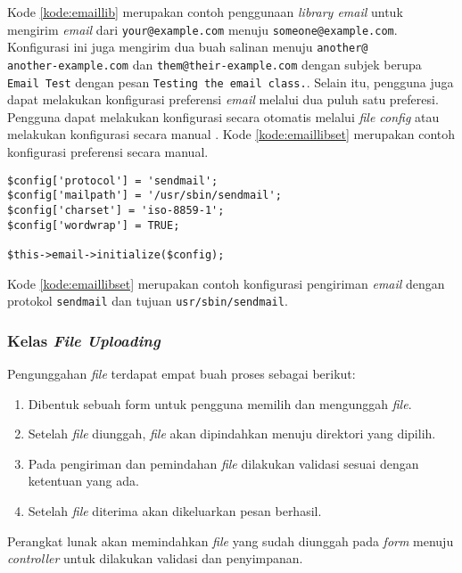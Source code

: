 Kode \ref{kode:emaillib} merupakan contoh penggunaan \textit{library email} untuk mengirim \textit{email} dari \texttt{your@example.com} menuju \texttt{someone@example.com}. Konfigurasi ini juga mengirim dua buah salinan menuju \texttt{another@\\another-example.com} dan \texttt{them@their-example.com} dengan subjek berupa \texttt{Email Test} dengan pesan \texttt{Testing the email class.}. Selain itu, pengguna juga dapat melakukan konfigurasi preferensi \textit{email} melalui dua puluh satu preferesi. Pengguna dapat melakukan konfigurasi secara otomatis melalui \textit{file config} atau melakukan konfigurasi secara manual . Kode \ref{kode:emaillibset} merupakan contoh konfigurasi preferensi secara manual.

\begin{lstlisting}[caption=Contoh konfigurasi preferensi \textit{library email} secara manual, label=kode:emaillibset]
$config['protocol'] = 'sendmail';
$config['mailpath'] = '/usr/sbin/sendmail';
$config['charset'] = 'iso-8859-1';
$config['wordwrap'] = TRUE;

$this->email->initialize($config);
\end{lstlisting}
Kode \ref{kode:emaillibset} merupakan contoh konfigurasi pengiriman \textit{email} dengan protokol \texttt{sendmail} dan tujuan \texttt{usr/sbin/sendmail}.

\subsubsection{Kelas \textit{File Uploading}}
Pengunggahan \textit{file} terdapat empat buah proses sebagai berikut:
\begin{enumerate}
\item Dibentuk sebuah form untuk pengguna memilih dan mengunggah \textit{file}.
\item Setelah \textit{file} diunggah, \textit{file} akan dipindahkan menuju direktori yang dipilih.
\item Pada pengiriman dan pemindahan \textit{file} dilakukan validasi sesuai dengan ketentuan yang ada.
\item Setelah \textit{file} diterima akan dikeluarkan pesan berhasil.
\end{enumerate}

Perangkat lunak akan memindahkan \textit{file} yang sudah diunggah pada \textit{form} menuju \textit{controller} untuk dilakukan validasi dan penyimpanan.

